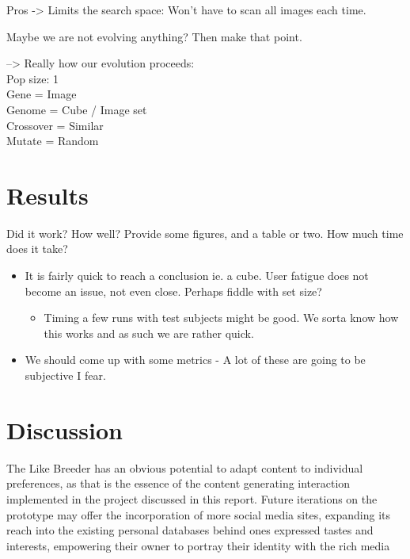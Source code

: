 \documentclass[]{article}
\begin{document}
Pros ->  Limits the search space:  Won’t have to scan all images each time.

Maybe we are not evolving anything?  Then make that point.

--> Really how our evolution proceeds:\\
Pop size: 1\\
Gene = Image\\
Genome = Cube / Image set\\
Crossover = Similar\\
Mutate = Random

\section{Results}
\label{sec:Results}
\begin{framed}
Did it work? How well? Provide some figures, and a table or two. How much time does it take?
\end{framed}
\begin{itemize}		
\item It is fairly quick to reach a conclusion ie. a cube. User fatigue does not become an issue, not even close. Perhaps fiddle with set size?
	\begin{itemize}
	\item Timing a few runs with test subjects might be good. We sorta know how this works and as such we are rather quick.
	\end{itemize}
\item We should come up with some metrics - A lot of these are going to be subjective I fear.
\end{itemize}



\section{Discussion}
\label{sec:Discussion}

The Like Breeder has an obvious potential to adapt content to individual preferences, as that is the essence of the content generating interaction implemented in the project discussed in this report.  Future iterations on the prototype may offer the incorporation of more social media sites, expanding its reach into the existing personal databases behind ones expressed tastes and interests, empowering their owner to portray their identity with the rich media contained within them.  This could result in a move towards singularity between the self conscious identity and that stored and presented in social media.
\end{document}
